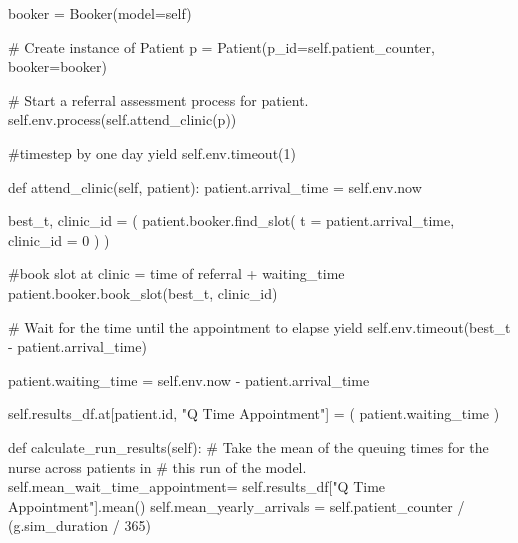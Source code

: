 \documentclass[
  letterpaper,
  DIV=11,
  numbers=noendperiod]{scrreprt}
\newenvironment{Shaded}{\begin{snugshade}}{\end{snugshade}}
\newcommand{\BuiltInTok}[1]{\textcolor[rgb]{0.00,0.23,0.31}{#1}}
\newcommand{\CommentTok}[1]{\textcolor[rgb]{0.37,0.37,0.37}{#1}}
\newcommand{\ControlFlowTok}[1]{\textcolor[rgb]{0.00,0.23,0.31}{#1}}
\newcommand{\DecValTok}[1]{\textcolor[rgb]{0.68,0.00,0.00}{#1}}
\newcommand{\KeywordTok}[1]{\textcolor[rgb]{0.00,0.23,0.31}{#1}}
\newcommand{\NormalTok}[1]{\textcolor[rgb]{0.00,0.23,0.31}{#1}}
\newcommand{\OperatorTok}[1]{\textcolor[rgb]{0.37,0.37,0.37}{#1}}
\newcommand{\StringTok}[1]{\textcolor[rgb]{0.13,0.47,0.30}{#1}}
\newcommand{\VariableTok}[1]{\textcolor[rgb]{0.07,0.07,0.07}{#1}}
\newcommand*\circled[1]{\tikz[baseline=(char.base)]{
          \node[shape=circle,draw,inner sep=1pt] (char) {{\scriptsize#1}};}}
\begin{document}
\begin{tcolorbox}
\begin{Shaded}
\begin{Highlighting}[]
\NormalTok{                booker }\OperatorTok{=}\NormalTok{ Booker(model}\OperatorTok{=}\VariableTok{self}\NormalTok{)}

                \CommentTok{\# Create instance of Patient}
\NormalTok{                p }\OperatorTok{=}\NormalTok{ Patient(p\_id}\OperatorTok{=}\VariableTok{self}\NormalTok{.patient\_counter, booker}\OperatorTok{=}\NormalTok{booker)}

                \CommentTok{\# Start a referral assessment process for patient.}
                \VariableTok{self}\NormalTok{.env.process(}\VariableTok{self}\NormalTok{.attend\_clinic(p))}

            \CommentTok{\#timestep by one day}
            \ControlFlowTok{yield} \VariableTok{self}\NormalTok{.env.timeout(}\DecValTok{1}\NormalTok{)}

    \KeywordTok{def}\NormalTok{ attend\_clinic(}\VariableTok{self}\NormalTok{, patient):}
\NormalTok{        patient.arrival\_time }\OperatorTok{=} \VariableTok{self}\NormalTok{.env.now}

\NormalTok{        best\_t, clinic\_id }\OperatorTok{=}\NormalTok{ (}
\NormalTok{                patient.booker.find\_slot(}
\NormalTok{                  t }\OperatorTok{=}\NormalTok{ patient.arrival\_time, }\hspace*{\fill}\NormalTok{\circled{1}}
\NormalTok{                  clinic\_id }\OperatorTok{=} \DecValTok{0} \hspace*{\fill}\NormalTok{\circled{2}}
\NormalTok{                  )}
\NormalTok{        )}

        \CommentTok{\#book slot at clinic = time of referral + waiting\_time}
\NormalTok{        patient.booker.book\_slot(best\_t, clinic\_id)}

        \CommentTok{\# Wait for the time until the appointment to elapse}
        \ControlFlowTok{yield} \VariableTok{self}\NormalTok{.env.timeout(best\_t }\OperatorTok{{-}}\NormalTok{ patient.arrival\_time)}

\NormalTok{        patient.waiting\_time }\OperatorTok{=} \VariableTok{self}\NormalTok{.env.now }\OperatorTok{{-}}\NormalTok{ patient.arrival\_time}

        \VariableTok{self}\NormalTok{.results\_df.at[patient.}\BuiltInTok{id}\NormalTok{, }\StringTok{"Q Time Appointment"}\NormalTok{] }\OperatorTok{=}\NormalTok{ (}
\NormalTok{                  patient.waiting\_time}
\NormalTok{                  )}

    \KeywordTok{def}\NormalTok{ calculate\_run\_results(}\VariableTok{self}\NormalTok{):}
        \CommentTok{\# Take the mean of the queuing times for the nurse across patients in}
        \CommentTok{\# this run of the model.}
        \VariableTok{self}\NormalTok{.mean\_wait\_time\_appointment}\OperatorTok{=} \VariableTok{self}\NormalTok{.results\_df[}\StringTok{"Q Time Appointment"}\NormalTok{].mean()}
        \VariableTok{self}\NormalTok{.mean\_yearly\_arrivals }\OperatorTok{=} \VariableTok{self}\NormalTok{.patient\_counter }\OperatorTok{/}\NormalTok{ (g.sim\_duration }\OperatorTok{/} \DecValTok{365}\NormalTok{)}


\end{Highlighting}
\end{Shaded}
\end{tcolorbox}
\end{document}
